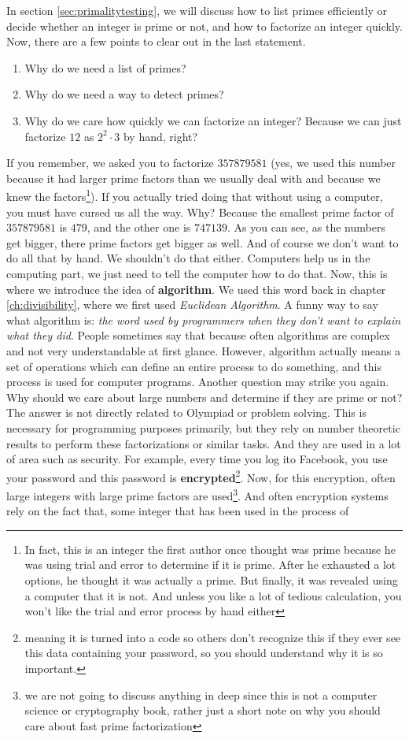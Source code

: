 \documentclass{subfiles}
\begin{document}
	In section \eqref{sec:primalitytesting}, we will discuss how to list primes efficiently or decide whether an integer is prime or not, and how to factorize an integer quickly. Now, there are a few points to clear out in the last statement.
	\begin{enumerate}
		\item Why do we need a list of primes?
		\item Why do we need a way to detect primes?
		\item Why do we care how quickly we can factorize an integer? Because we can just factorize $12$ as $2^2\cdot3$ by hand, right?
	\end{enumerate}
	If you remember, we asked you to factorize $357879581$ (yes, we used this number because it had larger prime factors than we usually deal with and because we knew the factors\footnote{In fact, this is an integer the first author once thought was prime because he was using trial and error to determine if it is prime. After he exhausted a lot options, he thought it was actually a prime. But finally, it was revealed using a computer that it is not. And unless you like a lot of tedious calculation, you won't like the trial and error process by hand either}). If you actually tried doing that without using a computer, you must have cursed us all the way. Why? Because the smallest prime factor of $357879581$ is $479$, and the other one is $747139$. As you can see, as the numbers get bigger, there prime factors get bigger as well. And of course we don't want to do all that by hand. We shouldn't do that either. Computers help us in the computing part, we just need to tell the computer how to do that. Now, this is where we introduce the idea of \textbf{algorithm}. We used this word back in chapter \eqref{ch:divisibility}, where we first used \textit{Euclidean Algorithm}. A funny way to say what algorithm is: \textit{the word used by programmers when they don't want to explain what they did}. People sometimes say that because often algorithms are complex and not very understandable at first glance. However, algorithm actually means a set of operations which can define an entire process to do something, and this process is used for computer programs. Another question may strike you again. Why should we care about large numbers and determine if they are prime or not? The answer is not directly related to Olympiad or problem solving. This is necessary for programming purposes primarily, but they rely on number theoretic results to perform these factorizations or similar tasks. And they are used in a lot of area such as security. For example, every time you log ito Facebook, you use your password and this password is \textbf{encrypted}\footnote{meaning it is turned into a code so others don't recognize this if they ever see this data containing your password, so you should understand why it is so important.}. Now, for this encryption, often large integers with large prime factors are used\footnote{we are not going to discuss anything in deep since this is not a computer science or cryptography book, rather just a short note on why you should care about fast prime factorization}. And often encryption systems rely on the fact that, some integer that has been used in the process of 
\end{document}
